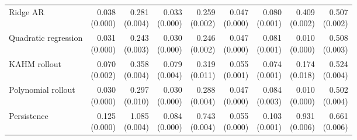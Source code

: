 \begin{table}[t]
\begin{tabular}{lrrrrrrrr}
Ridge AR & \shortstack[r]{0.038\\(0.000)} & \shortstack[r]{0.281\\(0.004)} & \shortstack[r]{0.033\\(0.000)} & \shortstack[r]{0.259\\(0.002)} & \shortstack[r]{0.047\\(0.000)} & \shortstack[r]{0.080\\(0.001)} & \shortstack[r]{0.409\\(0.002)} & \shortstack[r]{0.507\\(0.002)}\\[2pt]
Quadratic regression & \shortstack[r]{0.031\\(0.000)} & \shortstack[r]{0.243\\(0.003)} & \shortstack[r]{0.030\\(0.000)} & \shortstack[r]{0.246\\(0.002)} & \shortstack[r]{0.047\\(0.000)} & \shortstack[r]{0.081\\(0.001)} & \shortstack[r]{0.010\\(0.000)} & \shortstack[r]{0.508\\(0.003)}\\[2pt]
KAHM rollout & \shortstack[r]{0.070\\(0.002)} & \shortstack[r]{0.358\\(0.004)} & \shortstack[r]{0.079\\(0.004)} & \shortstack[r]{0.319\\(0.011)} & \shortstack[r]{0.055\\(0.001)} & \shortstack[r]{0.074\\(0.001)} & \shortstack[r]{0.174\\(0.018)} & \shortstack[r]{0.524\\(0.004)}\\[2pt]
Polynomial rollout & \shortstack[r]{0.030\\(0.000)} & \shortstack[r]{0.297\\(0.010)} & \shortstack[r]{0.030\\(0.000)} & \shortstack[r]{0.288\\(0.004)} & \shortstack[r]{0.047\\(0.000)} & \shortstack[r]{0.084\\(0.003)} & \shortstack[r]{0.010\\(0.000)} & \shortstack[r]{0.502\\(0.004)}\\[2pt]
Persistence & \shortstack[r]{0.125\\(0.000)} & \shortstack[r]{1.085\\(0.004)} & \shortstack[r]{0.084\\(0.000)} & \shortstack[r]{0.743\\(0.004)} & \shortstack[r]{0.055\\(0.000)} & \shortstack[r]{0.103\\(0.001)} & \shortstack[r]{0.931\\(0.006)} & \shortstack[r]{0.661\\(0.006)}\\[2pt]

\end{tabular}
\end{table}
